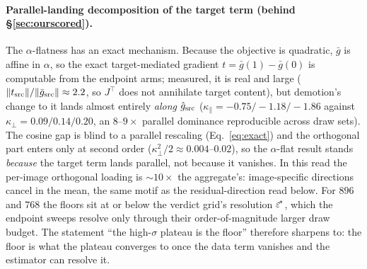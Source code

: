 \paragraph{Parallel-landing decomposition of the target term (behind
\S\ref{sec:ourscored}).} The $\alpha$-flatness has an exact mechanism.
Because the objective is quadratic, $\bar g$ is affine in $\alpha$, so
the exact target-mediated gradient $t = \bar g(1) - \bar g(0)$ is
computable from the endpoint arms; measured, it is real and large
($\|t_{\mathrm{src}}\|/\|\bar g_{\mathrm{src}}\| \approx 2.2$, so $J^{\!\top}$ does not
annihilate target content), but demotion's change to it lands almost
entirely \emph{along} $\hat g_{\mathrm{src}}$ ($\kappa_\parallel =
-0.75/-1.18/-1.86$ against $\kappa_\perp = 0.09/0.14/0.20$, an
$8$--$9\times$ parallel dominance reproducible across draw sets). The
cosine gap is blind to a parallel rescaling (Eq.~\ref{eq:exact}) and
the orthogonal part enters only at second order
($\kappa_\perp^2/2 \approx 0.004$--$0.02$), so the $\alpha$-flat result
stands \emph{because} the target term lands parallel, not because it
vanishes. In this read the per-image orthogonal loading is
${\sim}10\times$ the aggregate's: image-specific directions cancel in
the mean, the same motif as the residual-direction read below. For
$896$ and $768$ the floors sit at or below the verdict grid's
resolution $\varepsilon^{\!*}$, which the endpoint sweeps resolve only
through their order-of-magnitude larger draw budget. The statement
``the high-$\sigma$ plateau is the floor'' therefore sharpens to: the
floor is what the plateau converges to once the data term vanishes and
the estimator can resolve it.

